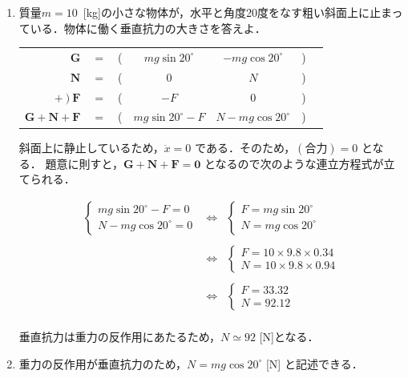 \documentclass[a4paper,11pt]{ltjsarticle}
\begin{document}
\begin{enumerate}
  \item 質量$m=10$\ [kg]の小さな物体が，水平と角度20度をなす粗い斜面上に止まっている．物体に働く垂直抗力の大きさを答えよ．
  \begin{table}[hb]
    \centering
    \begin{tabular}{rcccccc}
      $\bm{G}$ & $=$ & ( & $mg \sin 20^{\circ}$ & $-mg \cos 20^{\circ}$ & ) \\
      $\bm{N}$ & $=$ & ( & $0$ & $N$ & ) \\
      $+\ )\ \bm{F}$ & $=$ & ( & $-F$ & $0$ & ) \\
    \hline
      $\bm{G}+\bm{N}+\bm{F}$ & $=$ & ( & $mg \sin 20^{\circ}-F$ & $N-mg \cos 20^{\circ}$ & ) \\
    \end{tabular}
  \end{table}

  斜面上に静止しているため，$\ddot{x}=0$ である．そのため，$(合力) = 0$ となる．
  題意に則すと，$\bm{G}+\bm{N}+\bm{F} = \bm{0}$ となるので次のような連立方程式が立てられる．

  \begin{equation}
    \renewcommand{\arraystretch}{2}
    \begin{array}{rcl}
      \begin{cases}
        mg \sin 20^{\circ}-F = 0 \\
        N-mg \cos 20^{\circ} = 0
      \end{cases}
      &\Leftrightarrow&
      \begin{cases}
        F = mg \sin 20^{\circ} \\
        N = mg \cos 20^{\circ}
      \end{cases} \\
      \\[-20pt]
      &\Leftrightarrow&
      \begin{cases}
        F = 10 \times 9.8 \times 0.34 \\
        N = 10 \times 9.8 \times 0.94
      \end{cases} \\
      \\[-20pt]
      &\Leftrightarrow&
      \begin{cases}
        F = 33.32 \\
        N = 92.12
      \end{cases} \\
    \end{array}
  \end{equation}

  垂直抗力は重力の反作用にあたるため，$N \simeq 92$ [N]となる．


  \item[\textbf{別解？}] 重力の反作用が垂直抗力のため，$N = mg \cos 20^{\circ}$ [N] と記述できる．

\end{enumerate}
\end{document}
